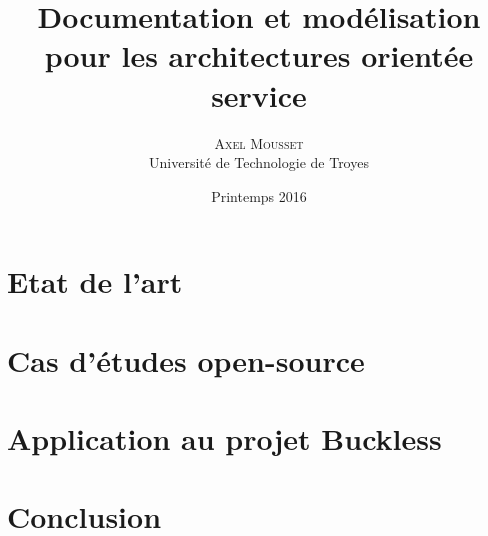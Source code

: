 \documentclass{article}
\title{\vspace{-15mm}\fontsize{24pt}{10pt}\selectfont\textbf{Documentation et modélisation pour les architectures orientée service}}
\author{
    \large
    \textsc{Axel Mousset}\\[2mm]
    \normalsize Université de Technologie de Troyes \\
    \vspace{-5mm}
}
\date{Printemps 2016}
\begin{document}
    \maketitle

    \begin{abstract}
        
    \end{abstract}

    \newpage
    \tableofcontents

    \thispagestyle{fancy}

    \newpage
    \section{Etat de l'art}
        

    \newpage
    \section{Cas d'études open-source}
        

    \newpage
    \section{Application au projet Buckless}
        

    \newpage
    \section{Conclusion}
        

    \newpage
        \begin{thebibliography}{1}
            
        \end{thebibliography}
\end{document}
